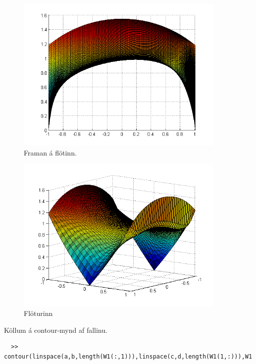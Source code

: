 \documentclass[11pt,a4paper,titlepage]{article}
\begin{document}
    \begin{figure}[h!]
        \centering
        \includegraphics[width=0.9\textwidth]{lagmarksflotur_framan.png}
        \caption{Framan á flötinn.}
        \label{fig:awesome_image12}
    \end{figure}

  \begin{figure}[h!]
      \centering
      \includegraphics[width=0.9\textwidth]{lagmarksflotur.png}
      \caption{Flöturinn}
      \label{fig:awesome_image13}
  \end{figure}
  Köllum á contour-mynd af fallinu.
  \begin{verbatim}
  >> contour(linspace(a,b,length(W1(:,1))),linspace(c,d,length(W1(1,:))),W1');
  \end{verbatim}
\end{document}
